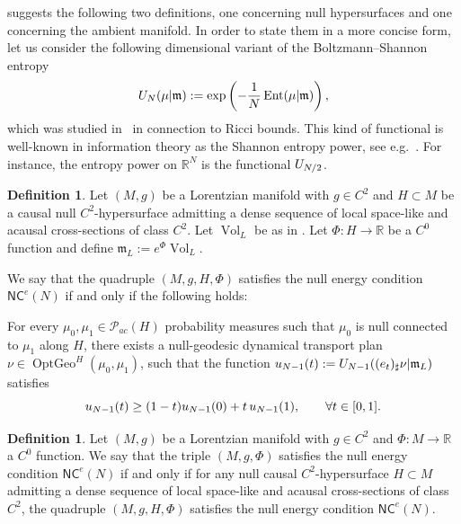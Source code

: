 \documentclass[12pt,a4paper]{amsart}
\theoremstyle{plain}
\theoremstyle{definition}
\newtheorem{definition}[lemma]{Definition}
\numberwithin{equation}{section}
\newcommand{\R}{\mathbb{R}}
\DeclareMathOperator{\Ent}{Ent}
\DeclareMathOperator{\OptGeo}{OptGeo}
\DeclareMathOperator{\vol}{Vol}
\newcommand{\NC}{\mathsf{NC}}
\newcommand{\Prob}{\mathcal P}
\newcommand{\mm}{\mathfrak m}
\begin{document}
 suggests the following two definitions, one
concerning null hypersurfaces and one concerning the ambient manifold. In order to state them in a more concise form, let us  consider the following dimensional variant of the Boltzmann--Shannon entropy
\begin{equation}\label{eq:defSPEnt}
{\rm U}_N(\mu|\mm):=\exp\left(-\frac{1}{N}\Ent(\mu|\mm) \right),
\end{equation}
which was studied in~\cite{EKS} in connection to Ricci bounds. This kind of functional is well-known in information theory as the
Shannon entropy power, see e.g.~\cite{DCT-1991}. For instance, the entropy power on $\R^N$ is the functional ${\rm U}_{N/2}$.


\begin{definition}\label{D:entropynullCD}
  Let $(M,g)$ be a Lorentzian manifold with $g\in C^2$
  and $H\subset M$ be a causal null $C^2$-hypersurface
  admitting a dense sequence of local space-like and
  acausal cross-sections of class $C^2$. Let $\vol_L$ be as in  . 
  Let $\Phi: H \to\R$  be a $C^0$ function
  and define $\mm_L:=  e^{\Phi}\vol_L$.
  
  We say that the quadruple $(M,g,H, \Phi)$ satisfies the null energy condition
  $\NC^e(N)$ if
  and only if the following holds:


  For every $\mu_0,\mu_1\in \Prob_{ac}(H)$ probability measures
  such that $\mu_0$ is null connected to $\mu_1$ along $H$,
  there exists  a null-geodesic
  dynamical transport plan $\nu\in\OptGeo^H(\mu_0,\mu_1)$,
  such that the function  ${\rm u}_{N-1}(t):={\rm U}_{N-1} ((e_t)_\sharp
    \nu|\mm_L)$ satisfies 
  \begin{equation}\label{eq:defNCE}
    {\rm u}_{N-1}(t)\geq
    (1-t)
    {\rm u}_{N-1}(0)
    +
    t\, 
    {\rm u}_{N-1}(1)
    ,
    \qquad
    \forall t\in[0,1]
    .
  \end{equation}
  \end{definition}

\begin{definition}\label{def:NCEspace}
  Let $(M,g)$ be a Lorentzian manifold with $g\in C^2$ and $\Phi:M\to\R$ a $C^0$ function.
  We say that the triple $(M,g,\Phi)$ satisfies the null energy
  condition $\NC^e(N)$ if and only if for any null causal $C^2$-hypersurface
  $H\subset M$ admitting a dense sequence of local space-like and
  acausal cross-sections of class $C^2$, the quadruple $(M,g,H, \Phi)$ satisfies the null energy condition $\NC^e(N)$.
\end{definition}
\end{document}

